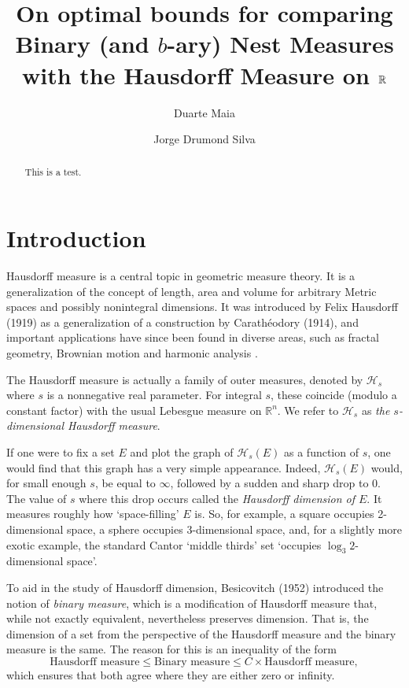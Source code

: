 \documentclass[11pt, reqno]{amsart}
\title[\textbf{Optimal bounds for $b$-ary measures}]{\textbf{On optimal bounds for comparing Binary (and $b$-ary) Nest Measures with the Hausdorff Measure on $\R$}}
\author{Duarte Maia}
\author{Jorge Drumond Silva}
\date{}
\newcommand{\R}{\mathbb{R}}
\newcommand{\HH}{\mathcal{H}}
\begin{document}
\begin{abstract}
This is a test.
\end{abstract}

\maketitle


\section{Introduction}

Hausdorff measure is a central topic in geometric measure theory. It is a generalization of the concept of length, area and volume for arbitrary Metric spaces and possibly nonintegral dimensions. It was introduced by Felix Hausdorff (1919) as a generalization of a construction by Carathéodory (1914), and important applications have since been found in diverse areas, such as fractal geometry, Brownian motion \cite{brownian} and harmonic analysis \cite{fefferman}.

The Hausdorff measure is actually a family of outer measures, denoted by $\HH_s$ where $s$ is a nonnegative real parameter. For integral $s$, these coincide (modulo a constant factor) with the usual Lebesgue measure on $\R^n$. We refer to $\HH_s$ as \emph{the $s$-dimensional Hausdorff measure}.

If one were to fix a set $E$ and plot the graph of $\HH_s(E)$ as a function of $s$, one would find that this graph has a very simple appearance. Indeed, $\HH_s(E)$ would, for small enough $s$, be equal to $\infty$, followed by a sudden and sharp drop to 0. The value of $s$ where this drop occurs called the \emph{Hausdorff dimension of $E$}. It measures roughly how `space-filling' $E$ is. So, for example, a square occupies 2-dimensional space, a sphere occupies 3-dimensional space, and, for a slightly more exotic example, the standard Cantor `middle thirds' set `occupies $\log_3 2$-dimensional space'.

To aid in the study of Hausdorff dimension, Besicovitch (1952) introduced the notion of \emph{binary measure}, which is a modification of Hausdorff measure that, while not exactly equivalent, nevertheless preserves dimension. That is, the dimension of a set from the perspective of the Hausdorff measure and the binary measure is the same. The reason for this is an inequality of the form
\begin{equation}\label{hbineq1}
\text{Hausdorff measure} \leq \text{Binary measure} \leq C \times \text{Hausdorff measure},
\end{equation}
which ensures that both agree where they are either zero or infinity.
\end{document}
